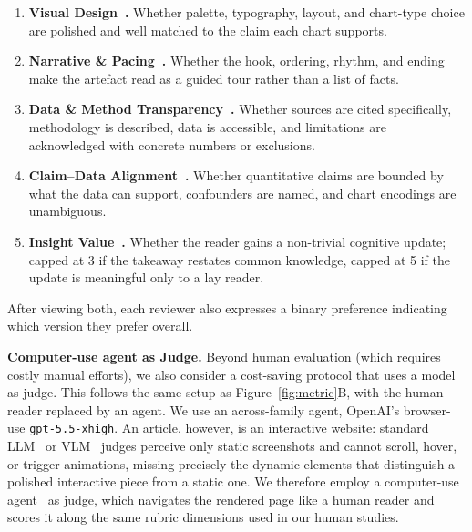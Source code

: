 \begin{enumerate}
\item \textbf{Visual Design~\cite{tufte2001visual,ware2004information}.} Whether palette, typography, layout, and chart-type choice are polished and well matched to the claim each chart supports.
\item \textbf{Narrative \& Pacing~\cite{segel2010narrative,knaflic2025storytelling}.} Whether the hook, ordering, rhythm, and ending make the artefact read as a guided tour rather than a list of facts.
\item \textbf{Data \& Method Transparency~\cite{cohen2011computational,diakopoulos2015algorithmic}.} Whether sources are cited specifically, methodology is described, data is accessible, and limitations are acknowledged with concrete numbers or exclusions.
\item \textbf{Claim--Data Alignment~\cite{gelman2013garden,cairo2016truthful}.} Whether quantitative claims are bounded by what the data can support, confounders are named, and chart encodings are unambiguous.
\item \textbf{Insight Value~\cite{grice1975logic,north2006toward}.} Whether the reader gains a non-trivial cognitive update; capped at 3 if the takeaway restates common knowledge, capped at 5 if the update is meaningful only to a lay reader.
\end{enumerate}

After viewing both, each reviewer also expresses a binary preference indicating which version they prefer overall.

\textbf{Computer-use agent as Judge.}
Beyond human evaluation (which requires costly manual efforts), we also consider a cost-saving protocol that uses a model as judge. This follows the same setup as Figure~\ref{fig:metric}B, with the human reader replaced by an agent. We use an across-family agent, OpenAI’s browser-use \texttt{gpt-5.5-xhigh}. 
An article, however, is an interactive website: standard LLM~\cite{zheng2023judging,zhuge2024agent} or VLM~\cite{chen2024mllm} judges perceive only static screenshots and cannot scroll, hover, or trigger animations, missing precisely the dynamic elements that distinguish a polished interactive piece from a static one. We therefore employ a computer-use agent~\cite{zhou2024webarena} as judge, which navigates the rendered page like a human reader and scores it along the same rubric dimensions used in our human studies. 

